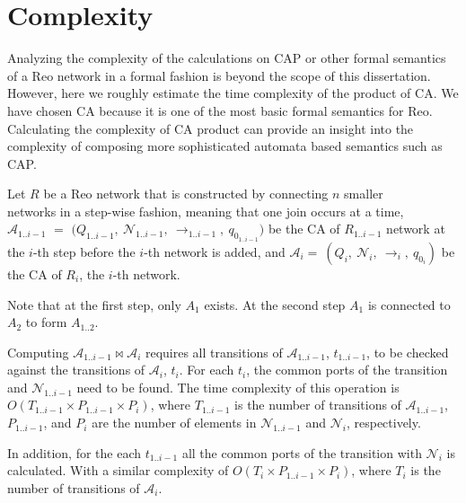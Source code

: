 %
\section{Complexity}
Analyzing the complexity of the calculations on CAP or other formal semantics of a Reo network in a formal fashion is beyond the scope of this dissertation. However, here we roughly estimate the time complexity of the product of CA. We have chosen CA because it is one of the most basic formal semantics for Reo. Calculating the complexity of CA product can provide an insight into the complexity of composing more sophisticated automata based semantics such as CAP.

Let $R$ be a Reo network that is constructed by connecting $n$ smaller \\ networks in a step-wise fashion, meaning that one join occurs at a time, \\ $\mathcal{A}_{1..i-1}$ $=$ $($$Q_{1..i-1},\ $$ \mathcal{N}_{1..i-1},\ $$\rightarrow_{1..i-1},$$\ q_{0_{1..i-1}})$  be the CA of $R_{1..i-1}$ network at the $i$-th step before the $i$-th network is added, and
$\mathcal{A}_{i}=\ (Q_{i},\ \mathcal{N}_{i},\ \rightarrow_{i},\ q_{0_{i}})$
 be the CA of $R_i$, the $i$-th network. 
 
Note that at the first step, only $A_1$ exists. At the second step $A_1$ is connected to $A_2$ to form $A_{1..2}$.

Computing $\mathcal{A}_{1..i-1} \bowtie \mathcal{A}_i$ requires all transitions of $\mathcal{A}_{1..i-1}$, $t_{1..i-1}$, %
to be checked against the transitions of $\mathcal{A}_i$, $t_i$. %
For each $t_i$, the common ports of the transition and $\mathcal{N}_{1..i-1}$ need to be found. The time complexity of this operation is $O(T_{1..i-1} \times P_{1..i-1} \times P_i)$, where $T_{1..i-1}$ is the number of transitions of $\mathcal{A}_{1..i-1}$, $P_{1..i-1}$, and $P_i$ are the number of elements in $\mathcal{N}_{1..i-1}$ and $\mathcal{N}_i$, respectively.  

In addition, for the each $t_{1..i-1}$ all the common ports of the transition with $\mathcal{N}_i$ is calculated. With a similar complexity of $O(T_{i} \times P_{1..i-1} \times P_i)$, where $T_{i}$ is the number of transitions of $\mathcal{A}_{i}$. %

